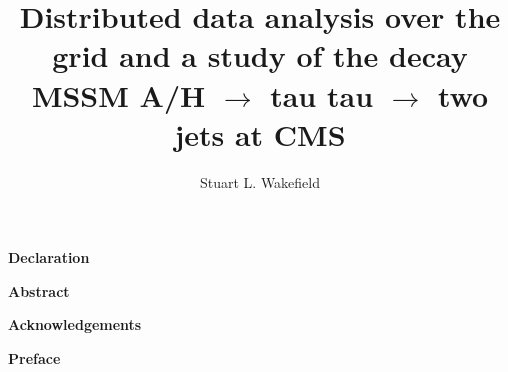 \documentclass[11pt,a4paper,pdftex]{report}
\author{Stuart L. Wakefield}
\title{Distributed data analysis over the grid and a study of the decay MSSM A/H $\rightarrow$ tau tau $\rightarrow$ two jets at CMS}
\begin{document}

\thispagestyle{empty}
\maketitle


\newpage
\begin{center}
{\bf Declaration}
\end{center}


\newpage
\begin{center}
{\bf Abstract}
\end{center}


\newpage
\begin{center}
{\bf Acknowledgements}
\end{center}


\newpage
\begin{center}
{\bf Preface}
\end{center}



\tableofcontents


%



















\singlespacing

\appendix




\end{document}
